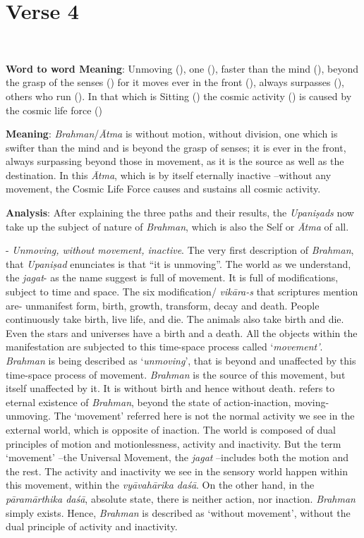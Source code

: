 \chapter{Verse 4}

\\

\textbf{Word to word Meaning}: Unmoving (), one (), faster than the mind (), beyond the grasp of the senses () for it moves ever in the front (), always surpasses (), others who run (). In that which is Sitting () the cosmic activity () is caused by the cosmic life force ()

\textbf{Meaning}: \emph{Brahman}/\emph{Ātma} is without motion, without division, one which is swifter than the mind and is beyond the grasp of senses; it is ever in the front, always surpassing beyond those in movement, as it is the source as well as the destination. In this \emph{Ātma}, which is by itself eternally inactive --without any movement, the Cosmic Life Force causes and sustains all cosmic activity.

\textbf{Analysis}: After explaining the three paths and their results, the \emph{Upaniṣads} now take up the subject of nature of \emph{Brahman}, which is also the Self or \emph{Ātma} of all.

- \emph{Unmoving, without movement, inactive}. The very first description of \emph{Brahman}, that \emph{Upaniṣad} enunciates is that ``it is unmoving''. The world as we understand, the \emph{jagat}- as the name suggest is full of movement. It is full of modifications, subject to time and space. The six modification/ \emph{vikāra-s} that scriptures mention are- unmanifest form, birth, growth, transform, decay and death. People continuously take birth, live life, and die. The animals also take birth and die. Even the stars and universes have a birth and a death. All the objects within the manifestation are subjected to this time-space process called `\emph{movement'}. \emph{Brahman} is being described as `\emph{unmoving}', that is beyond and unaffected by this time-space process of movement. \emph{Brahman} is the source of this movement, but itself unaffected by it. It is without birth and hence without death.  refers to eternal existence of \emph{Brahman}, beyond the state of action-inaction, moving-unmoving. The `movement' referred here is not the normal activity we see in the external world, which is opposite of inaction. The world is composed of dual principles of motion and motionlessness, activity and inactivity. But the term `movement' --the Universal Movement, the \emph{jagat} --includes both the motion and the rest. The activity and inactivity we see in the sensory world happen within this movement, within the \emph{vyāvahārika daśā}. On the other hand, in the \emph{pāramārthika daśā}, absolute state, there is neither action, nor inaction. \emph{Brahman} simply exists. Hence, \emph{Brahman} is described as `without movement', without the dual principle of activity and inactivity.

